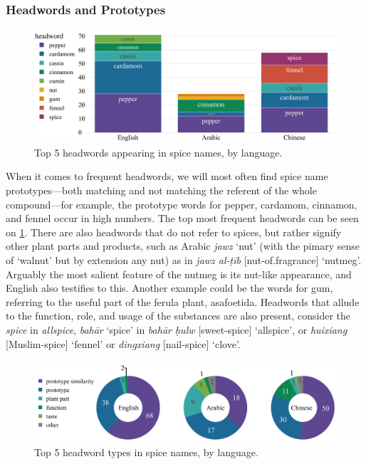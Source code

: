 



\subsubsection{Headwords and Prototypes}

\begin{figure}[ht!]
  \includegraphics[width=\linewidth]{imgs/plots/headword_bar.pdf}
  \caption{Top 5 headwords appearing in spice names, by language.}
  \label{fig:headword_bar}
\end{figure}

When it comes to frequent headwords, we will most often find spice name prototypes---both matching and not matching the referent of the whole compound---for example, the prototype words for pepper, cardamom, cinnamon, and fennel occur in high numbers. The top most frequent headwords can be seen on \cref{fig:headword_bar}. There are also headwords that do not refer to spices, but rather signify other plant parts and products, such as Arabic \textit{jawz} `nut' (with the pimary sense of `walnut' but by extension any nut) as in \textit{jawz al-ṭīb} [nut-of.fragrance] `nutmeg'. Arguably the most salient feature of the nutmeg is its nut-like appearance, and English also testifies to this. Another example could be the words for gum, referring to the useful part of the ferula plant, asafoetida. Headwords that allude to the function, role, and usage of the substances are also present, consider the \textit{spice} in \textit{allspice}, \textit{bahār} `spice' in \textit{bahār ḥulw}	[sweet-spice] `allspice', or \textit{huixiang} [Muslim-spice] `fennel' or \textit{dingxiang} [nail-spice] `clove'.

\begin{figure}[ht!]
  \includegraphics[width=\linewidth]{imgs/plots/headword_type_tripie.pdf}
  \caption{Top 5 headword types in spice names, by language.}
  \label{fig:headword_type_tripie}
\end{figure}

